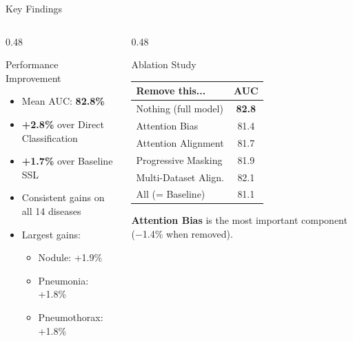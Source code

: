 \documentclass{beamer}
\begin{document}
\begin{frame}{Key Findings}
\begin{columns}[T]
\begin{column}{0.48\textwidth}
\begin{block}{Performance Improvement}
\begin{itemize}
    \item Mean AUC: \textbf{82.8\%}
    \item \textbf{+2.8\%} over Direct Classification
    \item \textbf{+1.7\%} over Baseline SSL
    \item Consistent gains on all 14 diseases
    \item Largest gains:
    \begin{itemize}
        \item Nodule: +1.9\%
        \item Pneumonia: +1.8\%
        \item Pneumothorax: +1.8\%
    \end{itemize}
\end{itemize}
\end{block}
\end{column}
\begin{column}{0.48\textwidth}
\begin{block}{Ablation Study}
\footnotesize
\begin{tabular}{@{}lc@{}}
\toprule
\textbf{Remove this...} & \textbf{AUC} \\
\midrule
Nothing (full model) & \textbf{82.8} \\
Attention Bias & 81.4 \\
Attention Alignment & 81.7 \\
Progressive Masking & 81.9 \\
Multi-Dataset Align. & 82.1 \\
All (= Baseline) & 81.1 \\
\bottomrule
\end{tabular}
\end{block}
\vspace{4pt}
\small \textbf{Attention Bias} is the most important component ($-$1.4\% when removed).
\end{column}
\end{columns}
\end{frame}
\end{document}
